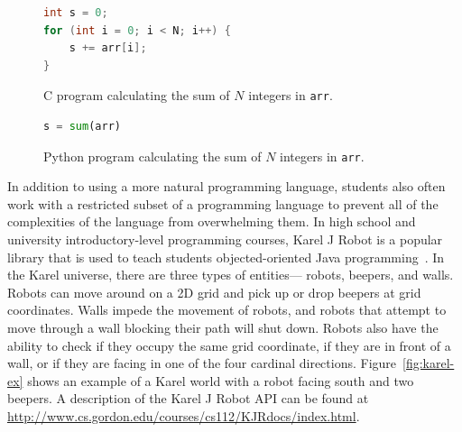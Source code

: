 \documentclass[11pt]{article}
\begin{document}
\begin{figure}[ht]
\begin{lstlisting}[language=C]
int s = 0;
for (int i = 0; i < N; i++) {
    s += arr[i];
}
\end{lstlisting}
\label{fig:c-prog}
\caption{C program calculating the sum of $N$ integers in \texttt{arr}.}
\end{figure}

\begin{figure}[ht]
\begin{lstlisting}[language=python]
s = sum(arr)
\end{lstlisting}
\label{fig:python-prog}
\caption{Python program calculating the sum of $N$ integers in \texttt{arr}.}
\end{figure}

In addition to using a more natural programming language, students also often work with a
restricted subset of a programming language to prevent all of the complexities of the language from
overwhelming them. In high school and university introductory-level programming courses, Karel J
Robot is a popular library that is used to teach students objected-oriented Java
programming~\cite{Bergin:2013aa}. In the Karel universe, there are three types of entities---
robots, beepers, and walls. Robots can move around on a 2D grid and pick up or drop beepers at grid
coordinates. Walls impede the movement of robots, and robots that attempt to move through a wall
blocking their path will shut down. Robots also have the ability to check if they occupy the same
grid coordinate, if they are in front of a wall, or if they are facing in one of the four cardinal
directions. Figure~\ref{fig:karel-ex} shows an example of a Karel world with a robot facing south
and two beepers. A description of the Karel J Robot API can be found at
\url{http://www.cs.gordon.edu/courses/cs112/KJRdocs/index.html}.
\end{document}
